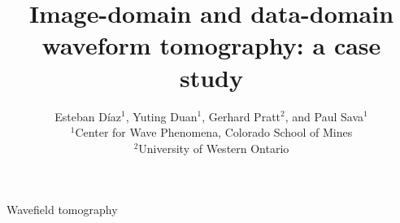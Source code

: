 

\newcommand*{\mytext}[2]{%
\noindent\color{#1!80}{%
\parbox{0.98\linewidth}{#2}}}%

\author[D\'{i}az et al.]{Esteban D\'{i}az$^{1}$, Yuting Duan$^{1}$, Gerhard Pratt$^2$, and Paul Sava$^{1}$\\ 
$^1$Center for Wave Phenomena, 
Colorado School of Mines\\
$^2$University of Western Ontario}
\title[Wavefield tomography]{Image-domain and data-domain waveform tomography: a case study}


\newif\ifreport
\reporttrue

\maketitle

\begin{keywords}
Wavefield tomography
\end{keywords}







\cleardoublepage

